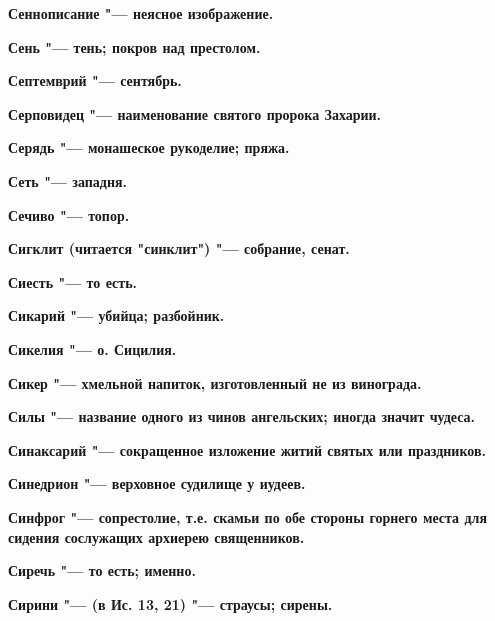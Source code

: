 \bfseries Сеннописание \normalfont{} "--- неясное изображение. 




\bfseries Сень \normalfont{} "--- тень; покров над престолом. 




\bfseries Септемврий \normalfont{} "--- сентябрь. 




\bfseries Серповидец \normalfont{} "--- наименование святого пророка Захарии. 




\bfseries Серядь \normalfont{} "--- монашеское рукоделие; пряжа. 




\bfseries Сеть \normalfont{} "--- западня. 




\bfseries Сечиво \normalfont{} "--- топор. 




\bfseries Сигклит \normalfont{} (читается "синклит") "--- собрание, сенат. 




\bfseries Сиесть \normalfont{} "--- то есть. 




\bfseries Сикарий \normalfont{} "--- убийца; разбойник. 




\bfseries Сикелия \normalfont{} "--- о. Сицилия. 




\bfseries Сикер \normalfont{} "--- хмельной напиток, изготовленный не из винограда. 




\bfseries Силы \normalfont{} "--- название одного из чинов ангельских; иногда значит чудеса. 




\bfseries Синаксарий \normalfont{} "--- сокращенное изложение житий святых или праздников. 




\bfseries Синедрион \normalfont{} "--- верховное судилище у иудеев. 




\bfseries Синфрог \normalfont{} "--- сопрестолие, т.е. скамьи по обе стороны горнего места для сидения сослужащих архиерею священников. 




\bfseries Сиречь \normalfont{} "--- то есть; именно. 




\bfseries Сирини \normalfont{} "--- (в Ис. 13, 21) "--- страусы; сирены. 




